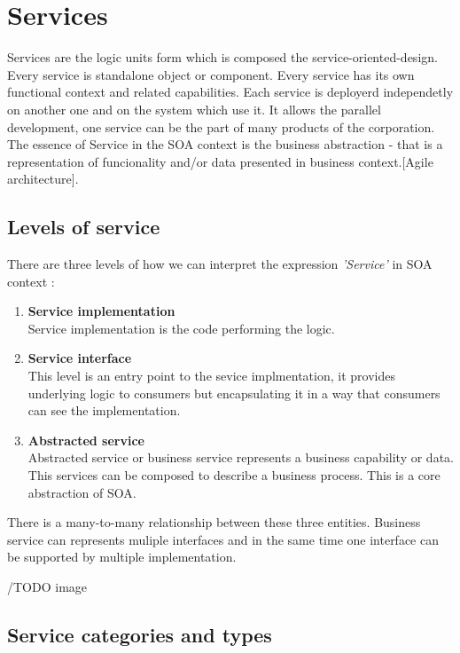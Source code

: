 \section{Services}
\label{sec:services}
Services are the logic units form which is composed the \gls{service-oriented-design}. Every service is standalone object or component. Every service has its own functional context and related capabilities. Each service is deployerd independetly on another one and on the system which use it. It allows the parallel development, one service can be the part of many products of the corporation.
The essence of Service in the SOA context is the business abstraction - that is a representation of funcionality and/or data presented in business context.[Agile architecture].

\subsection{Levels of service} 

There are three levels of how we can interpret the expression \emph{'Service'} in SOA context \cite{agile-architecture}:
\begin{enumerate}
  \item \textbf{Service implementation} \hfill \\
Service implementation is the code performing the logic.
  \item \textbf{Service interface} \hfill \\ 
This level is an entry point to the sevice implmentation, it provides underlying logic to consumers but encapsulating it in a way that consumers can see the implementation. 
  \item \textbf{Abstracted service} \hfill \\
Abstracted service or business service represents a business capability or data. This services can be composed to describe a business process. This is a core abstraction of SOA.
\end{enumerate}

There is a many-to-many relationship between these three entities. Business service can represents muliple interfaces and in the same time one interface can be supported by multiple implementation.

/TODO image

\subsection{Service categories and types} %

